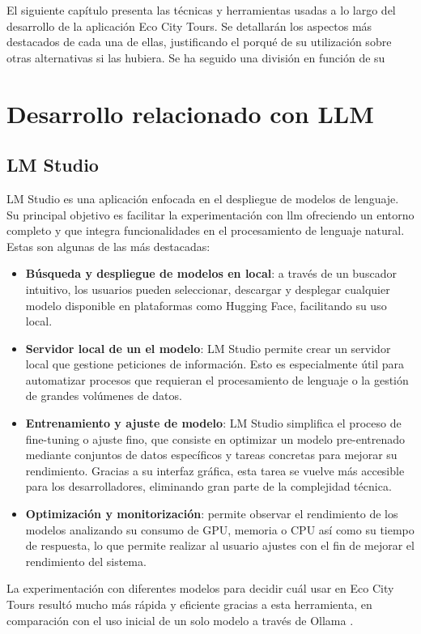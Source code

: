
El siguiente capítulo presenta las técnicas y herramientas usadas a lo largo del desarrollo de la aplicación Eco City Tours. Se detallarán los aspectos más destacados de cada una de ellas, justificando el porqué de su utilización sobre otras alternativas si las hubiera. Se ha seguido una división en función de su 


\section{Desarrollo relacionado con LLM}
	\subsection{LM Studio}
	LM Studio \cite{lmstudio_ai} es una aplicación enfocada en el despliegue de modelos de lenguaje. Su principal objetivo es facilitar la experimentación con \acrlong{llm} ofreciendo un entorno completo y que integra funcionalidades en el procesamiento de lenguaje natural.
	Estas son algunas de las más destacadas:
	
	
	\begin{itemize}
		
		\item \textbf{Búsqueda y despliegue de modelos en local}: a través de un buscador intuitivo, los usuarios pueden seleccionar, descargar y desplegar cualquier modelo disponible en plataformas como Hugging Face, facilitando su uso local.
		
		\item \textbf{Servidor local de un el modelo}: LM Studio permite crear un servidor local que gestione peticiones de información. Esto es especialmente útil para automatizar procesos que requieran el procesamiento de lenguaje o la gestión de grandes volúmenes de datos.
		
		\item \textbf{Entrenamiento y ajuste de modelo}: LM Studio simplifica el proceso de fine-tuning o ajuste fino, que consiste en optimizar un modelo pre-entrenado mediante conjuntos de datos específicos y tareas concretas para mejorar su rendimiento. Gracias a su interfaz gráfica, esta tarea se vuelve más accesible para los desarrolladores, eliminando gran parte de la complejidad técnica.
		
		\item \textbf{Optimización y monitorización}: permite observar el rendimiento de los modelos analizando su consumo de GPU, memoria o CPU así como su tiempo de respuesta, lo que permite realizar al usuario ajustes con el fin de mejorar el rendimiento del sistema.
	\end{itemize}
	La experimentación con diferentes modelos para decidir cuál usar en Eco City Tours resultó mucho más rápida y eficiente gracias a esta herramienta, en comparación con el uso inicial de un solo modelo a través de Ollama \cite{ollama}.
		
